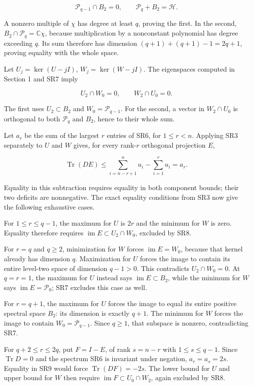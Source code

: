 \[
\mathcal P_{q-1}\cap B_2=0,\qquad
\mathcal P_q+B_2=\mathcal H.
\tag{SR7}
\]

A nonzero multiple of \(\chi\) has degree at least \(q\), proving the first. In the second, \(B_2\cap\mathcal P_q=\mathbb C\chi\), because multiplication by a nonconstant polynomial has degree exceeding \(q\). Its sum therefore has dimension \((q+1)+(q+1)-1=2q+1\), proving equality with the whole space.

Let \(U_j=\ker(U-jI)\), \(W_j=\ker(W-jI)\). The eigenspaces computed in Section 1 and SR7 imply

\[
U_2\cap W_0=0,\qquad W_2\cap U_0=0.
\tag{SR8}
\]

The first uses \(U_2\subset B_2\) and \(W_0=\mathcal P_{q-1}\). For the second, a vector in \(W_2\cap U_0\) is orthogonal to both \(\mathcal P_q\) and \(B_2\), hence to their whole sum.

Let \(a_r\) be the sum of the largest \(r\) entries of SR6, for \(1\le r<n\). Applying SR3 separately to \(U\) and \(W\) gives, for every rank-\(r\) orthogonal projection \(E\),

\[
\operatorname{Tr}(DE)\le
\sum_{i=n-r+1}^{n}u_i-\sum_{i=1}^{r}u_i=a_r.
\tag{SR9}
\]

Equality in this subtraction requires equality in both component bounds; their two deficits are nonnegative. The exact equality conditions from SR3 now give the following exhaustive cases.

For \(1\le r\le q-1\), the maximum for \(U\) is \(2r\) and the minimum for \(W\) is zero. Equality therefore requires \(\operatorname{im}E\subset U_2\cap W_0\), excluded by SR8.

For \(r=q\) and \(q\ge2\), minimization for \(W\) forces \(\operatorname{im}E=W_0\), because that kernel already has dimension \(q\). Maximization for \(U\) forces the image to contain its entire level-two space of dimension \(q-1>0\). This contradicts \(U_2\cap W_0=0\). At \(q=r=1\), the maximum for \(U\) instead says \(\operatorname{im}E\subset B_2\), while the minimum for \(W\) says \(\operatorname{im}E=\mathcal P_0\); SR7 excludes this case as well.

For \(r=q+1\), the maximum for \(U\) forces the image to equal its entire positive spectral space \(B_2\): its dimension is exactly \(q+1\). The minimum for \(W\) forces the image to contain \(W_0=\mathcal P_{q-1}\). Since \(q\ge1\), that subspace is nonzero, contradicting SR7.

For \(q+2\le r\le2q\), put \(F=I-E\), of rank \(s=n-r\) with \(1\le s\le q-1\). Since \(\operatorname{Tr}D=0\) and the spectrum SR6 is invariant under negation, \(a_r=a_s=2s\). Equality in SR9 would force \(\operatorname{Tr}(DF)=-2s\). The lower bound for \(U\) and upper bound for \(W\) then require \(\operatorname{im}F\subset U_0\cap W_2\), again excluded by SR8.

